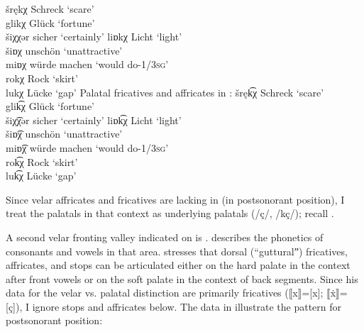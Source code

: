 \ea\label{ex:15:41a} šrękχ \tab [ʃrɛkx] \tab Schreck \tab ‘scare’ \\
    glikχ \tab [glikx] \tab Glück \tab ‘fortune’ \\
    šiχχər \tab [sixxər] \tab sicher \tab ‘certainly’ 
\ex\label{ex:15:41b} liɒkχ \tab [liɒkx] \tab Licht \tab ‘light’ \\
    šiɒχ \tab  [ʃiɒx] \tab unschön \tab ‘unattractive’ \\
    miɒχ \tab [miɒx] \tab würde machen \tab ‘would do-\textsc{1/3}\textsc{sg}’ \\
    rokχ \tab [rokx] \tab Rock \tab ‘skirt’ \\
    lukχ \tab [lukx] \tab Lücke \tab ‘gap’ 
\z
\ex%
\label{ex:15:42}Palatal fricatives and affricates in :
\ea\label{ex:15:42a} šręk͡χ \tab [ʃrɛkç] \tab Schreck \tab ‘scare’ \\
    glik͡χ \tab [glikç] \tab Glück \tab ‘fortune’ \\
    šiχ͡χər \tab [siççər] \tab sicher \tab ‘certainly’ 
\ex\label{ex:15:42b} liɒk͡χ \tab [liɒkç] \tab Licht \tab ‘light’ \\
    šiɒ͡χ \tab  [ʃiɒç] \tab unschön \tab ‘unattractive’ \\
    miɒ͡χ \tab [miɒç] \tab würde machen \tab ‘would do-\textsc{1/3}\textsc{sg}’ \\
    rok͡χ \tab [rokç] \tab Rock \tab ‘skirt’ \\
    luk͡χ \tab [lukç] \tab Lücke \tab ‘gap’ 
    \z
\z 

Since velar affricates and fricatives are lacking in  (in postsonorant position), I treat the palatals in that context as underlying palatals (/ç/, /kç/); recall .

A second velar fronting valley indicated on  is . \citet{Egger1909} describes the phonetics of consonants and vowels in that area. \citet[15]{Egger1909} stresses that dorsal (“gutturalˮ) fricatives, affricates, and stops can be articulated either on the hard palate in the context after front vowels or on the soft palate in the context of back segments. Since his data for the velar vs. palatal distinction are primarily fricatives (⟦x⟧=[x]; ⟦\.{x}⟧=[ç]), I ignore stops and affricates below. The data in  illustrate the pattern for postsonorant position:\largerpage

